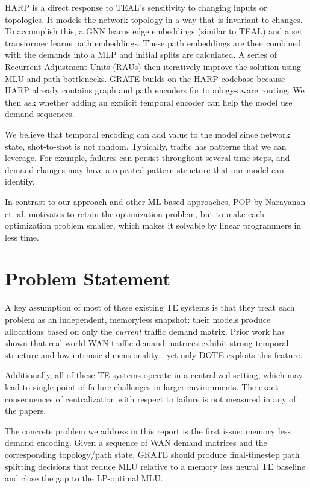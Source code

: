 \documentclass[letterpaper,twocolumn,10pt]{article}
\begin{document}
HARP is a direct response to TEAL's sensitivity to changing inputs or topologies. It models the network topology in a way that is invariant to changes. To accomplish this, a GNN learns edge embeddings (similar to TEAL) and a set transformer learns path embeddings. These path embeddings are then combined with the demands into a MLP and initial splits are calculated. A series of Recurrent Adjustment Units (RAUs) then iteratively improve the solution using MLU and path bottlenecks. GRATE builds on the HARP codebase because HARP already contains graph and path encoders for topology-aware routing. We then ask whether adding an explicit temporal encoder can help the model use demand sequences.

We believe that temporal encoding can add value to the model since network state, shot-to-shot is not random. Typically, traffic has patterns that we can leverage. For example, failures can persist throughout several time steps, and demand changes may have a repeated pattern structure that our model can identify. 

In contrast to our approach and other ML based approaches, POP\cite{narayanan2021pop} by Narayanan et. al. motivates to retain the optimization problem, but to make each optimization problem smaller, which makes it solvable by linear programmers in less time. 

\section{Problem Statement}

A key assumption of most of these existing TE systems is that they treat each problem as an independent, memoryless snapshot: their models produce allocations based on only the \emph{current} traffic demand matrix. Prior work has shown that real-world WAN traffic demand matrices exhibit strong temporal structure and low intrinsic dimensionality \cite{lakhina2004structural}, 
yet only DOTE \cite{perry2023dote} exploits this feature.

Additionally, all of these TE systems operate in a centralized setting, which may lead to single-point-of-failure challenges in larger environments. The exact consequences of centralization with respect to failure is not measured in any of the papers.

The concrete problem we address in this report is the first issue: memory less demand encoding. Given a sequence of WAN demand matrices and the corresponding topology/path state, GRATE should produce final-timestep path splitting decisions that reduce MLU relative to a memory less neural TE baseline and close the gap to the LP-optimal MLU.
\end{document}
